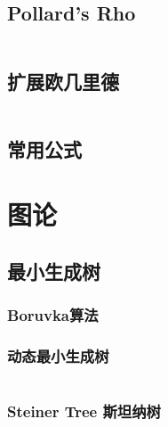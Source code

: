 \documentclass[a4paper]{article}
\begin{document}
\begin{multicols}{2}
			\subsection{Pollard's Rho}
				\inputminted{cpp}{../src/numbertheory/Pollard-Rho.cpp}
			


			\subsection{扩展欧几里德}
				\inputminted{cpp}{../src/math/exgcd.cpp}
				
			
			\subsection{常用公式}
				
				

		\section{图论}

			\subsection{最小生成树}
				\subsubsection{Boruvka算法}
					
				
				\subsubsection{动态最小生成树}
					\inputminted{cpp}{../src/graph/动态最小生成树.cpp}
				

				
				\subsubsection{Steiner Tree 斯坦纳树}
					
			

\end{multicols}
\end{document}
